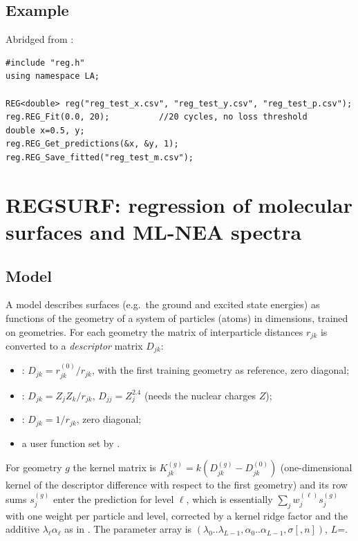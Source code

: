 \subsection{Example}
Abridged from :
\begin{lstlisting}
#include "reg.h"
using namespace LA;

REG<double> reg("reg_test_x.csv", "reg_test_y.csv", "reg_test_p.csv");
reg.REG_Fit(0.0, 20);          //20 cycles, no loss threshold
double x=0.5, y;
reg.REG_Get_predictions(&x, &y, 1);
reg.REG_Save_fitted("reg_test_m.csv");
\end{lstlisting}

\section{REGSURF: regression of molecular surfaces and ML-NEA spectra}\label{sec:regression:regsurf}

\subsection{Model}
A  model describes  surfaces (e.g.\ the ground and excited state
energies) as functions of the geometry of a system of  particles (atoms) in
 dimensions, trained on  geometries. For each
geometry the matrix of interparticle distances $r_{jk}$ is converted to a \emph{descriptor}
matrix $D_{jk}$:
\begin{itemize}
\item {}: $D_{jk}=r^{(0)}_{jk}/r_{jk}$, with the first training geometry as reference, zero diagonal;
\item {}: $D_{jk}=Z_jZ_k/r_{jk}$, $D_{jj}=Z_j^{2.4}$ (needs the nuclear charges $Z$);
\item {}: $D_{jk}=1/r_{jk}$, zero diagonal;
\item a user function set by .
\end{itemize}
For geometry $g$ the kernel matrix is $K^{(g)}_{jk}=k(D^{(g)}_{jk}-D^{(0)}_{jk})$ (one-dimensional
kernel of the descriptor difference with respect to the first geometry) and its row sums
$s^{(g)}_j$ enter the prediction for level $\ell$, which is essentially $\sum_j w^{(\ell)}_j s^{(g)}_j$
with one weight per particle and level, corrected by a kernel ridge factor and the additive
$\lambda_\ell\alpha_\ell$ as in . The parameter array is
$(\lambda_0..\lambda_{L-1}, \alpha_0..\alpha_{L-1}, \sigma[, n])$, $L$=.


